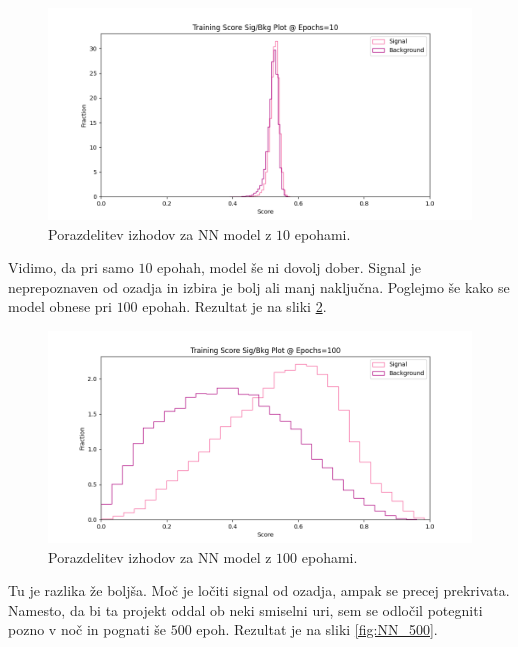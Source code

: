 \documentclass[a4paper]{article}
\begin{document}
\begin{figure}[H]
    \centering
    \includegraphics[width=1\textwidth]{../images/NNsig_bk_10.png}
    \caption{Porazdelitev izhodov za NN model z $10$ epohami.}
    \label{fig:NN_10}
\end{figure}

Vidimo, da pri samo $10$ epohah, model še ni dovolj dober. Signal je neprepoznaven od ozadja in izbira je bolj ali manj
naključna. Poglejmo še kako se model obnese pri $100$ epohah. Rezultat je na sliki \ref{fig:NN_100}. \\

\begin{figure}[H]
    \centering
    \includegraphics[width=1\textwidth]{../images/NNsig_bk_100.png}
    \caption{Porazdelitev izhodov za NN model z $100$ epohami.}
    \label{fig:NN_100}
\end{figure}

Tu je razlika že boljša. Moč je ločiti signal od ozadja, ampak se precej prekrivata. Namesto, da bi ta projekt oddal
ob neki smiselni uri, sem se odločil potegniti pozno v noč in pognati še $500$ epoh. Rezultat je na sliki \ref{fig:NN_500}. \\
\end{document}
